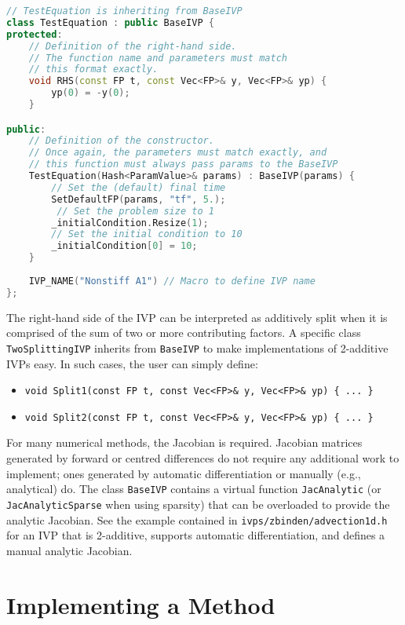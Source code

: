\documentclass[11pt]{article}
\begin{document}
\begin{lstlisting}[tabsize=4,language=c++]
// TestEquation is inheriting from BaseIVP
class TestEquation : public BaseIVP {	
protected: 
	// Definition of the right-hand side.
	// The function name and parameters must match
	// this format exactly.
	void RHS(const FP t, const Vec<FP>& y, Vec<FP>& yp) {
		yp(0) = -y(0);
	}

public:
	// Definition of the constructor.
	// Once again, the parameters must match exactly, and
	// this function must always pass params to the BaseIVP
	TestEquation(Hash<ParamValue>& params) : BaseIVP(params) {
		// Set the (default) final time
		SetDefaultFP(params, "tf", 5.);
		 // Set the problem size to 1
		_initialCondition.Resize(1);
		// Set the initial condition to 10
		_initialCondition[0] = 10;
	}
	
	IVP_NAME("Nonstiff A1") // Macro to define IVP name
};
\end{lstlisting}

The right-hand side of the IVP can be interpreted as additively split
when it is comprised of the sum of two or more contributing factors. A
specific class \verb=TwoSplittingIVP= inherits from \verb=BaseIVP= to
make implementations of 2-additive IVPs easy. In such cases, the user can
simply define:
\begin{itemize}
\item \verb=void Split1(const FP t, const Vec<FP>& y, Vec<FP>& yp) { ... }=
\item \verb=void Split2(const FP t, const Vec<FP>& y, Vec<FP>& yp) { ... }=
\end{itemize}

For many numerical methods, the Jacobian is required. Jacobian
matrices generated by forward or centred differences do not require
any additional work to implement; ones generated by automatic
differentiation or manually (e.g., analytical) do. The class
\verb=BaseIVP= contains a virtual function \verb=JacAnalytic= (or
\verb=JacAnalyticSparse= when using sparsity) that can be overloaded
to provide the analytic Jacobian. See the example contained in
\verb=ivps/zbinden/advection1d.h= for an IVP that is 2-additive,
supports automatic differentiation, and defines a manual analytic
Jacobian.

\section{Implementing a Method}
\end{document}
